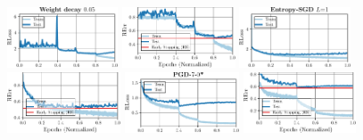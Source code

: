 \begin{figure}[t]
\begin{minipage}[t]{0.19\textwidth}
		\includegraphics[height=1.8cm]{plots_supp_training_curves_wd005_loss}
		
		\hspace*{-0.25cm}
		\includegraphics[height=1.8cm]{plots_supp_training_curves_wd005_error}
	\end{minipage}
	\begin{minipage}[t]{0.19\textwidth}
		\vspace*{0px}
		
		\includegraphics[height=1.8cm]{plots_supp_training_curves_esgd1_loss}
		
		\hspace*{-0.25cm}
		\includegraphics[height=1.8cm]{plots_supp_training_curves_esgd1_error}
	\end{minipage}
	\begin{minipage}[t]{0.19\textwidth}
		\vspace*{0px}
		
		\includegraphics[height=1.8cm]{plots_supp_training_curves_tau0_loss}
		
		\hspace*{-0.15cm}
		\includegraphics[height=1.8cm]{plots_supp_training_curves_tau0_error}
	\end{minipage}
	\begin{minipage}[t]{0.19\textwidth}
		\vspace*{0px}
		

\end{minipage}
\end{figure}
